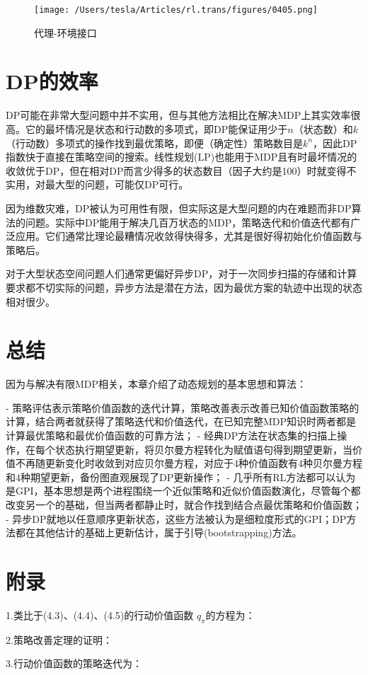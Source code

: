 \documentclass{ctexart}
\begin{document}
\begin{figure}[htbp]
    \centering
    \texttt{[image: /Users/tesla/Articles/rl.trans/figures/0405.png]}
    \caption{代理-环境接口}
    \label{fig:0405} 
\end{figure}



\section{DP的效率}

DP可能在非常大型问题中并不实用，但与其他方法相比在解决MDP上其实效率很高。它的最坏情况是状态和行动数的多项式，即DP能保证用少于$n$（状态数）和$k$（行动数）多项式的操作找到最优策略，即便（确定性）策略数目是$k^n$，因此DP指数快于直接在策略空间的搜索。线性规划(LP)也能用于MDP且有时最坏情况的收敛优于DP，但在相对DP而言少得多的状态数目（因子大约是100）时就变得不实用，对最大型的问题，可能仅DP可行。

因为维数灾难，DP被认为可用性有限，但实际这是大型问题的内在难题而非DP算法的问题。实际中DP能用于解决几百万状态的MDP，策略迭代和价值迭代都有广泛应用。它们通常比理论最糟情况收敛得快得多，尤其是很好得初始化价值函数与策略后。

对于大型状态空间问题人们通常更偏好异步DP，对于一次同步扫描的存储和计算要求都不切实际的问题，异步方法是潜在方法，因为最优方案的轨迹中出现的状态相对很少。



\section{总结}

因为与解决有限MDP相关，本章介绍了动态规划的基本思想和算法：

- 策略评估表示策略价值函数的迭代计算，策略改善表示改善已知价值函数策略的计算，结合两者就获得了策略迭代和价值迭代，在已知完整MDP知识时两者都是计算最优策略和最优价值函数的可靠方法；
- 经典DP方法在状态集的扫描上操作，在每个状态执行期望更新，将贝尔曼方程转化为赋值语句得到期望更新，当价值不再随更新变化时收敛到对应贝尔曼方程，对应于4种价值函数有4种贝尔曼方程和4种期望更新，备份图直观展现了DP更新操作；
- 几乎所有RL方法都可以认为是GPI，基本思想是两个进程围绕一个近似策略和近似价值函数演化，尽管每个都改变另一个的基础，但当两者都静止时，就合作找到结合点最优策略和价值函数；
- 异步DP就地以任意顺序更新状态，这些方法被认为是细粒度形式的GPI；DP方法都在其他估计的基础上更新估计，属于引导(bootstrapping)方法。



\section{附录}

1.类比于(4.3)、(4.4)、(4.5)的行动价值函数 $q_\pi$的方程为：

2.策略改善定理的证明：

3.行动价值函数的策略迭代为：
\end{document}
